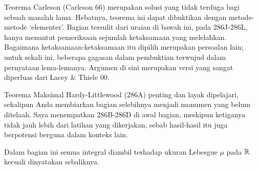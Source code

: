   
\newdimen\sparewidth

\def\chaptername{Analisis Fourier} \def\sectionname{Teorema Carleson}

\def\energy{\mathop{\text{energi}}\nolimits}
\def\Innerprod#1#2{\bigl(#1\bigr|#2\bigr)}
\def\mass{\mathop{\text{massa}}\nolimits}
\def\recheck{\discrversionA{\immediate\write0{query}
\global\advance\footnotenumber by 1
\oldfootnote{$^{\the\footnotenumber}$}{recheck}}{}}
\def\vartildef{\tilde{\hbox{$f$}}}



Teorema Carleson ({\smc Carleson 66}) merupakan solusi %
yang tidak terduga bagi sebuah masalah lama. Hebatnya, teorema ini dapat
dibuktikan dengan metode-metode `elementer'. Bagian tersulit dari uraian di
bawah ini, pada 286J-286L, hanya menuntut pemeriksaan sejumlah
ketaksamaan yang melelahkan. Bagaimana ketaksamaan-ketaksamaan itu dipilih
merupakan persoalan lain; untuk sekali ini, beberapa gagasan dalam pembuktian
terwujud dalam pernyataan lema-lemanya. Argumen di sini merupakan versi yang
sangat diperluas dari {\smc Lacey \& Thiele 00}.

Teorema Maksimal Hardy-Littlewood (286A) penting dan layak dipelajari,
sekalipun Anda membiarkan bagian selebihnya menjadi monumen yang belum
ditelaah. Saya menempatkan 286B-286D %
di awal bagian, meskipun ketiganya tidak jauh lebih dari latihan yang
dikerjakan, sebab hasil-hasil itu juga berpotensi berguna dalam konteks lain.



Dalam bagian ini semua integral diambil terhadap ukuran Lebesgue $\mu$ pada
$\Bbb R$ kecuali dinyatakan sebaliknya.


